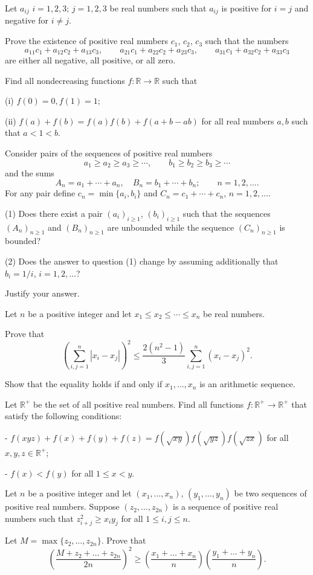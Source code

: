 \item[\textbf{A1.}]Let $a_{ij}$ $i=1,2,3$; $j=1,2,3$ be real numbers such that $a_{ij}$ is positive for $i=j$ and negative for $i\neq j$.

Prove the existence of positive real numbers $c_{1}$,  $c_{2}$,  $c_{3}$ such that the numbers \[a_{11}c_{1}+a_{12}c_{2}+a_{13}c_{3},\qquad a_{21}c_{1}+a_{22}c_{2}+a_{23}c_{3},\qquad a_{31}c_{1}+a_{32}c_{2}+a_{33}c_{3}\]are either all negative, all positive, or all zero.
\item[\textbf{A2.}]Find all nondecreasing functions $f: \mathbb{R}\rightarrow\mathbb{R}$ such that

(i) $f(0) = 0, f(1) = 1;$

(ii) $f(a) + f(b) = f(a)f(b) + f(a + b - ab)$ for all real numbers $a, b$ such that $a < 1 < b$.
\item[\textbf{A3.}]Consider pairs of the sequences of positive real numbers \[a_1\geq a_2\geq a_3\geq\cdots,\qquad b_1\geq b_2\geq b_3\geq\cdots\]and the sums \[A_n = a_1 + \cdots + a_n,\quad B_n = b_1 + \cdots + b_n;\qquad n = 1,2,\ldots.\]For any pair define $c_n = \min\{a_i,b_i\}$ and $C_n = c_1 + \cdots + c_n$,  $n=1,2,\ldots$.

(1) Does there exist a pair $(a_i)_{i\geq 1}$,  $(b_i)_{i\geq 1}$ such that the sequences $(A_n)_{n\geq 1}$ and $(B_n)_{n\geq 1}$ are unbounded while the sequence $(C_n)_{n\geq 1}$ is bounded?

(2) Does the answer to question (1) change by assuming additionally that $b_i = 1/i$,  $i=1,2,\ldots$?

Justify your answer.
\item[\textbf{A4.}]Let $n$ be a positive integer and let $x_1\le x_2\le\cdots\le x_n$ be real numbers.

Prove that\[
          \left(\sum_{i,j=1}^{n}|x_i-x_j|\right)^2\le\frac{2(n^2-1)}{3}\sum_{i,j=1}^{n}(x_i-x_j)^2.
             \]

Show that the equality holds if and only if $x_1, \ldots, x_n$ is an arithmetic sequence.
\item[\textbf{A5.}]Let $\mathbb{R}^+$ be the set of all positive real numbers. Find all functions $f: \mathbb{R}^+ \to \mathbb{R}^+$ that satisfy the following conditions:

- $f(xyz)+f(x)+f(y)+f(z)=f(\sqrt{xy})f(\sqrt{yz})f(\sqrt{zx})$ for all $x,y,z\in\mathbb{R}^+$;

- $f(x)<f(y)$ for all $1\le x<y$.
\item[\textbf{A6.}]Let $n$ be a positive integer and let $(x_1,\ldots,x_n)$,  $(y_1,\ldots,y_n)$ be two sequences of positive real numbers.  Suppose $(z_2,\ldots,z_{2n})$ is a sequence of positive real numbers such that $z_{i+j}^2 \geq x_iy_j$ for all $1\le i,j \leq n$.

Let $M=\max\{z_2,\ldots,z_{2n}\}$.  Prove that \[
	\left( \frac{M+z_2+\dots+z_{2n}}{2n} \right)^2
	\ge
	\left( \frac{x_1+\dots+x_n}{n} \right)
	\left( \frac{y_1+\dots+y_n}{n} \right). \]
